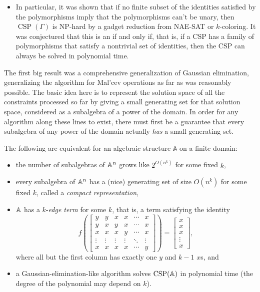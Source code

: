 \documentclass[letterpaper,11pt]{article}
\DeclareMathOperator{\CSP}{CSP}
\begin{document}
\begin{itemize}
\item In particular, it was shown that if no finite subset of the identities satisfied by the polymorphisms imply that the polymorphisms can't be unary, then $\CSP(\Gamma)$ is NP-hard by a gadget reduction from NAE-SAT or $k$-coloring. It was conjectured that this is an if and only if, that is, if a CSP has a family of polymorphisms that satisfy a nontrivial set of identities, then the CSP can always be solved in polynomial time.
\end{itemize}

The first big result was a comprehensive generalization of Gaussian elimination, generalizing the algorithm for Mal'cev operations as far as was reasonably possible. The basic idea here is to represent the solution space of all the constraints processed so far by giving a small generating set for that solution space, considered as a subalgebra of a power of the domain. In order for any algorithm along these lines to exist, there must first be a guarantee that every subalgebra of any power of the domain actually \emph{has} a small generating set.

\begin{thm} The following are equivalent for an algebraic structure $\mathbb{A}$ on a finite domain:
\begin{itemize}
\item the number of subalgebras of $\mathbb{A}^n$ grows like $2^{O(n^k)}$ for some fixed $k$,

\item every subalgebra of $\mathbb{A}^n$ has a (nice) generating set of size $O(n^k)$ for some fixed $k$, called a \emph{compact representation},

\item $\mathbb{A}$ has a $k$-\emph{edge term} for some $k$, that is, a term satisfying the identity
\[
f\left(\begin{bmatrix}y & y & x & x & \cdots & x\\ y & x & y & x & \cdots & x\\ x & x & x & y & \cdots & x\\ \vdots & \vdots & \vdots & \vdots & \ddots & \vdots \\ x & x & x & x & \cdots & y \end{bmatrix}\right) = \begin{bmatrix}x\\ x\\ x\\ \vdots \\ x\end{bmatrix},
\]
where all but the first column has exactly one $y$ and $k-1$ $x$s, and

\item a Gaussian-elimination-like algorithm solves $\CSP(\bA)$ in polynomial time (the degree of the polynomial may depend on $k$).
\end{itemize}
\end{thm}
\end{document}

